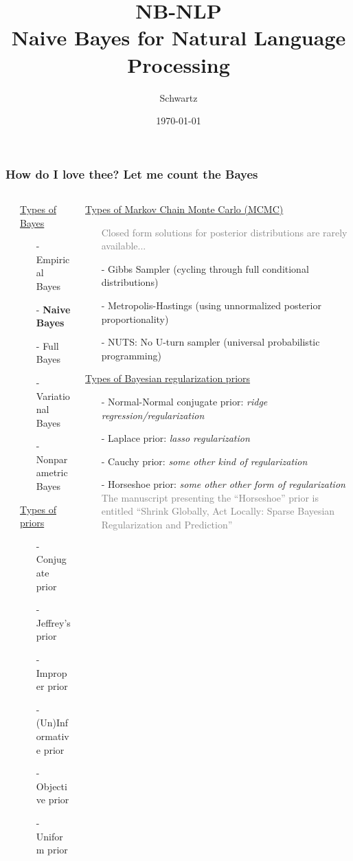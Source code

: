 \documentclass[xcolor={dvipsnames}]{beamer}
\title{NB-NLP\\
Naive Bayes for Natural Language Processing}
\author{Schwartz}
\date{\today}
\begin{document}
\frame{\titlepage}


{
\beamertemplatenavigationsymbolsempty

\frame
{
 \frametitle{How do I love thee? Let me count the Bayes}

\vspace{.5em}
\begin{columns}
\begin{column}{.00\textwidth}
\end{column}
\begin{column}{.3\textwidth}
\scriptsize
\underline{Types of Bayes} 
\tiny
\begin{itemize}
\setlength\itemsep{.2em}
\item[-] Empirical Bayes
\item[-] \textbf{Naive Bayes}
\item[-] Full Bayes
\item[-] Variational Bayes
\item[-] Nonparametric Bayes
\end{itemize} 
\scriptsize
\underline{Types of priors}
\tiny
\begin{itemize}
\setlength\itemsep{.2em}
\item[-] Conjugate prior
\item[-] Jeffrey's prior
\item[-] Improper prior
\item[-] (Un)Informative prior
\item[-] Objective prior
\item[-] Uniform prior
\end{itemize}
\end{column}
\scriptsize
\begin{column}{.67\textwidth}
\scriptsize
\underline{Types of Markov Chain Monte Carlo (MCMC)} 
\tiny
\begin{itemize}
\item[] \textcolor{gray}{Closed form solutions for posterior distributions are rarely available...} 
\item[-] Gibbs Sampler (cycling through full conditional distributions)
\item[-] Metropolis-Hastings (using unnormalized posterior proportionality)
\item[-] NUTS: No U-turn sampler (universal probabilistic programming)
\end{itemize}
\scriptsize
\underline{Types of Bayesian regularization priors} 
\tiny
\begin{itemize}
\item[-] Normal-Normal conjugate prior: \emph{ridge regression/regularization}
\item[-] Laplace prior: \emph{lasso regularization}
\item[-] Cauchy prior: \emph{some other kind of regularization}
\item[-] Horseshoe prior: \emph{some other other form of regularization}\\
\textcolor{gray}{The manuscript presenting the ``Horseshoe'' prior is entitled
``Shrink Globally, Act Locally: Sparse Bayesian Regularization and Prediction''}
\end{itemize}
\end{column}
\end{columns}

}}
\end{document}
